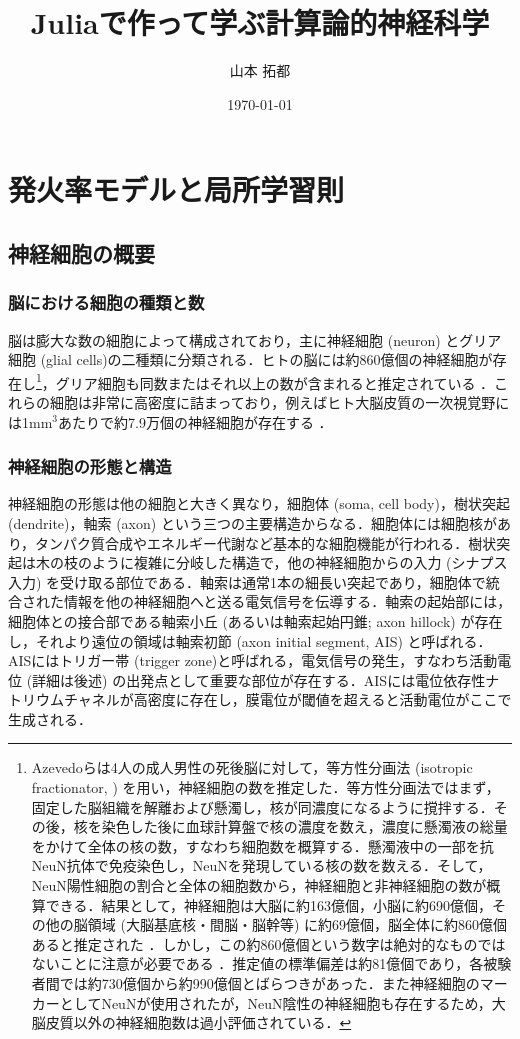 \documentclass[titlepage]{ltjsbook}
\title{\Huge \textbf{Juliaで作って学ぶ計算論的神経科学}}
\author{\huge 山本 拓都}
\date{\huge \today}
\begin{document}
\setcounter{tocdepth}{2}
\tableofcontents
\clearpage
\chapter{発火率モデルと局所学習則}
\section{神経細胞の概要}
\subsection{脳における細胞の種類と数}
脳は膨大な数の細胞によって構成されており，主に神経細胞 (neuron) とグリア細胞 (glial cells)の二種類に分類される．ヒトの脳には約860億個の神経細胞が存在し\footnote{Azevedoらは4人の成人男性の死後脳に対して，等方性分画法 (isotropic fractionator, \citep{herculano2005isotropic}) を用い，神経細胞の数を推定した．等方性分画法ではまず，固定した脳組織を解離および懸濁し，核が同濃度になるように撹拌する．その後，核を染色した後に血球計算盤で核の濃度を数え，濃度に懸濁液の総量をかけて全体の核の数，すなわち細胞数を概算する．懸濁液中の一部を抗NeuN抗体で免疫染色し，NeuNを発現している核の数を数える．そして，NeuN陽性細胞の割合と全体の細胞数から，神経細胞と非神経細胞の数が概算できる．結果として，神経細胞は大脳に約163億個，小脳に約690億個，その他の脳領域 (大脳基底核・間脳・脳幹等) に約69億個，脳全体に約860億個あると推定された \citep{azevedo2009equal}．しかし，この約860億個という数字は絶対的なものではないことに注意が必要である \citep{goriely2024eighty}．推定値の標準偏差は約81億個であり，各被験者間では約730億個から約990億個とばらつきがあった．また神経細胞のマーカーとしてNeuNが使用されたが，NeuN陰性の神経細胞も存在するため，大脳皮質以外の神経細胞数は過小評価されている．}，グリア細胞も同数またはそれ以上の数が含まれると推定されている \citep{azevedo2009equal, von2016search}．これらの細胞は非常に高密度に詰まっており，例えばヒト大脳皮質の一次視覚野には1mm$^3$あたりで約7.9万個の神経細胞が存在する \citep{garcia2024neuronal}．

\subsection{神経細胞の形態と構造}
神経細胞の形態は他の細胞と大きく異なり，細胞体 (soma, cell body)，樹状突起(dendrite)，軸索 (axon) という三つの主要構造からなる．細胞体には細胞核があり，タンパク質合成やエネルギー代謝など基本的な細胞機能が行われる．樹状突起は木の枝のように複雑に分岐した構造で，他の神経細胞からの入力 (シナプス入力) を受け取る部位である．軸索は通常1本の細長い突起であり，細胞体で統合された情報を他の神経細胞へと送る電気信号を伝導する．軸索の起始部には，細胞体との接合部である軸索小丘 (あるいは軸索起始円錐; axon hillock) が存在し，それより遠位の領域は軸索初節 (axon initial segment, AIS)  と呼ばれる．AISにはトリガー帯 (trigger zone)と呼ばれる，電気信号の発生，すなわち活動電位 (詳細は後述) の出発点として重要な部位が存在する．AISには電位依存性ナトリウムチャネルが高密度に存在し，膜電位が閾値を超えると活動電位がここで生成される．
\end{document}
